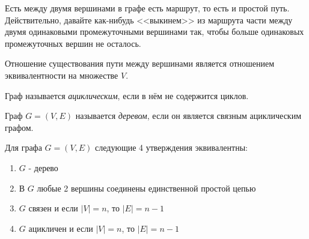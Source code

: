 \begin{note}
	Есть между двумя вершинами в графе есть маршрут, то есть и простой путь. Действительно, давайте как-нибудь <<выкинем>> из маршрута части между двумя одинаковыми промежуточными вершинами так, чтобы больше одинаковых промежуточных вершин не осталось.
\end{note}

\begin{note}
	Отношение существования пути между вершинами является отношением эквивалентности на множестве $V$.
\end{note}

\begin{definition}
	Граф называется \textit{ациклическим}, если в нём не содержится циклов.
\end{definition}

\begin{definition}
	Граф $G = (V, E)$ называется \textit{деревом}, если он является связным ациклическим графом.
\end{definition}

\begin{theorem}
	Для графа $G = (V, E)$ следующие 4 утверждения эквивалентны:
	\begin{enumerate}
		\item $G$ - дерево
		
		\item В $G$ любые 2 вершины соединены единственной простой цепью
		
		\item $G$ связен и если $|V| = n$, то $|E| = n - 1$
		
		\item $G$ ацикличен и если $|V| = n$, то $|E| = n - 1$
	\end{enumerate}
\end{theorem}

